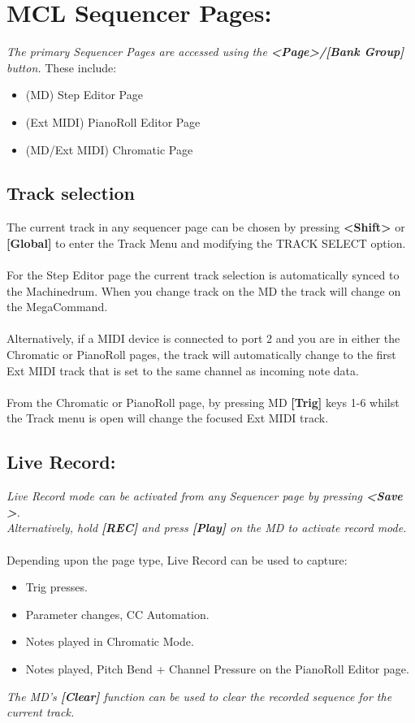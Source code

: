\chapter{MCL Sequencer Pages:}

\textit{The primary Sequencer Pages are accessed using the \textbf{<Page>/[Bank Group]} button.} These include:
\begin{itemize}
    \item (MD) Step Editor Page
    \item (Ext MIDI) PianoRoll Editor Page
    \item (MD/Ext MIDI) Chromatic Page
\end{itemize}
\section{Track selection}
The current track in any sequencer page can be chosen by pressing \textbf{<Shift>} or \textbf{[Global]} to enter the Track Menu and modifying the TRACK SELECT option.
\\\\
For the Step Editor page the current track selection is automatically synced to the Machinedrum. When you change track on the MD the track will change on the MegaCommand.\\\\
Alternatively, if a MIDI device is connected to port 2 and you are in either the Chromatic or PianoRoll pages, the track will automatically change to the first Ext MIDI track that is set to the same channel as incoming note data.\\\\
From the Chromatic or PianoRoll page, by pressing MD \textbf{[Trig]} keys 1-6 whilst the Track menu is open will change the focused Ext MIDI track.
\section{Live Record:}
\textit{Live Record mode can be activated from any Sequencer page by pressing \textbf{<Save >}.\\Alternatively, hold \textbf{[REC]} and press \textbf{[Play]} on the MD to activate record mode.}\\\\Depending upon the page type, Live Record can be used to capture:
\begin{itemize}
    \item Trig presses.
    \item Parameter changes, CC Automation.
    \item Notes played in Chromatic Mode.
    \item Notes played, Pitch Bend + Channel Pressure on the PianoRoll Editor page.
\end{itemize}
\textit{The MD's \textbf{[Clear]} function can be used to clear the recorded sequence for the current track.}

